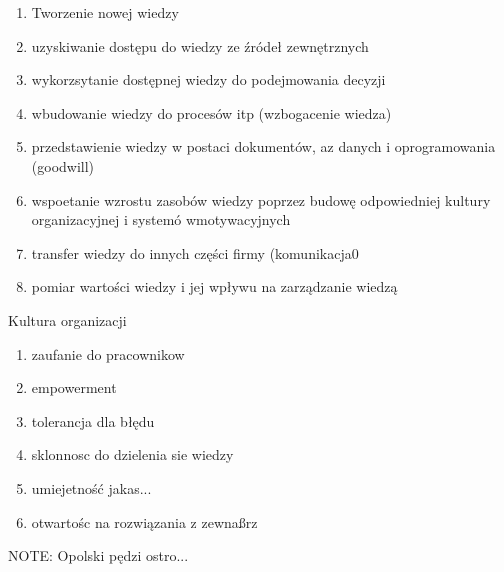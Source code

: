\documentclass[a4paper,10pt]{report}
\begin{document}
\begin{enumerate}
	\item Tworzenie nowej wiedzy
	\item uzyskiwanie dostępu do wiedzy ze źródeł zewnętrznych
	\item wykorzsytanie dostępnej wiedzy do podejmowania decyzji
	\item wbudowanie wiedzy do procesów itp (wzbogacenie wiedza)
	\item przedstawienie wiedzy w postaci dokumentów, az danych i oprogramowania (goodwill)
	\item wspoetanie wzrostu zasobów wiedzy poprzez budowę odpowiedniej kultury organizacyjnej i systemó wmotywacyjnych
	\item transfer wiedzy do innych części firmy (komunikacja0
	\item pomiar wartości wiedzy i jej wpływu na zarządzanie wiedzą
\end{enumerate}

Kultura organizacji
\begin{enumerate}
	\item zaufanie do pracownikow
	\item empowerment
	\item tolerancja dla błędu
	\item sklonnosc do dzielenia sie wiedzy
	\item umiejetność jakas...
	\item otwartośc na rozwiązania z zewnaßrz
\end{enumerate}

NOTE: Opolski pędzi ostro...

\medskip
	
\end{document}
